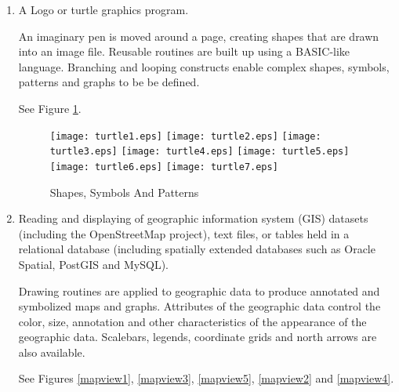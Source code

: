 \begin{enumerate}
\item

A Logo or turtle graphics program.

An imaginary pen is moved around a page,
creating shapes that are drawn into an image file.
Reusable routines are built up using a BASIC-like language.
Branching and looping constructs enable complex shapes, symbols, patterns
and graphs to be be defined.

See Figure \ref{turtle}.

\begin{figure}[htb]
\texttt{[image: turtle1.eps]}
\texttt{[image: turtle2.eps]}
\texttt{[image: turtle3.eps]}
\texttt{[image: turtle4.eps]}
\texttt{[image: turtle5.eps]}
\texttt{[image: turtle6.eps]}
\texttt{[image: turtle7.eps]}
\caption{Shapes, Symbols And Patterns}
\label{turtle}
\end{figure}

\item

Reading and displaying of geographic information
system (GIS) datasets (including the OpenStreetMap project),
text files, or tables held in a relational database
(including spatially extended databases such as Oracle Spatial,
PostGIS and MySQL).

Drawing routines are applied to geographic data to produce annotated and
symbolized maps and graphs.  Attributes of the geographic data control
the color, size, annotation and other characteristics of the
appearance of the geographic data.
Scalebars, legends, coordinate grids and north arrows are also available.

See Figures \ref{mapview1}, \ref{mapview3}, \ref{mapview5}, \ref{mapview2}
and \ref{mapview4}.


\end{enumerate}
